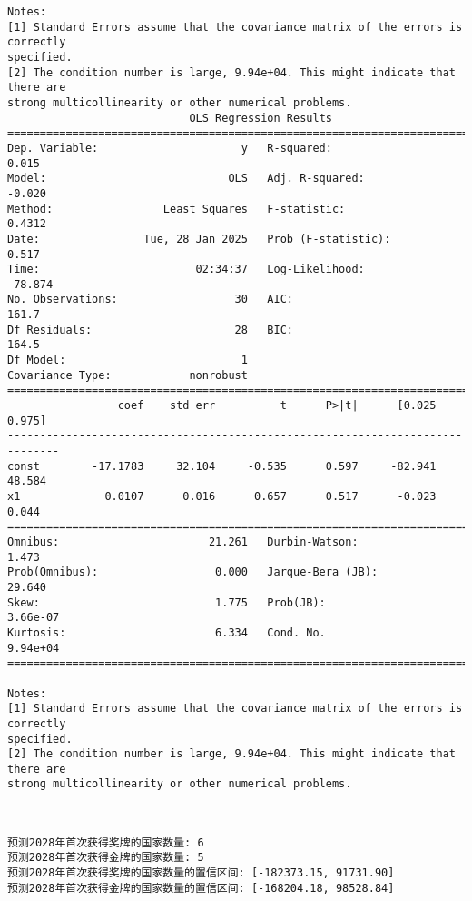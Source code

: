 \documentclass[11pt]{article}
\begin{document}
\begin{Verbatim}[commandchars=\\\{\}]
Notes:
[1] Standard Errors assume that the covariance matrix of the errors is correctly
specified.
[2] The condition number is large, 9.94e+04. This might indicate that there are
strong multicollinearity or other numerical problems.
                            OLS Regression Results
==============================================================================
Dep. Variable:                      y   R-squared:                       0.015
Model:                            OLS   Adj. R-squared:                 -0.020
Method:                 Least Squares   F-statistic:                    0.4312
Date:                Tue, 28 Jan 2025   Prob (F-statistic):              0.517
Time:                        02:34:37   Log-Likelihood:                -78.874
No. Observations:                  30   AIC:                             161.7
Df Residuals:                      28   BIC:                             164.5
Df Model:                           1
Covariance Type:            nonrobust
==============================================================================
                 coef    std err          t      P>|t|      [0.025      0.975]
------------------------------------------------------------------------------
const        -17.1783     32.104     -0.535      0.597     -82.941      48.584
x1             0.0107      0.016      0.657      0.517      -0.023       0.044
==============================================================================
Omnibus:                       21.261   Durbin-Watson:                   1.473
Prob(Omnibus):                  0.000   Jarque-Bera (JB):               29.640
Skew:                           1.775   Prob(JB):                     3.66e-07
Kurtosis:                       6.334   Cond. No.                     9.94e+04
==============================================================================

Notes:
[1] Standard Errors assume that the covariance matrix of the errors is correctly
specified.
[2] The condition number is large, 9.94e+04. This might indicate that there are
strong multicollinearity or other numerical problems.
    \end{Verbatim}

    \begin{center}
    \end{center}
    { \hspace*{\fill} \\}
    
    \begin{Verbatim}[commandchars=\\\{\}]
预测2028年首次获得奖牌的国家数量: 6
预测2028年首次获得金牌的国家数量: 5
预测2028年首次获得奖牌的国家数量的置信区间: [-182373.15, 91731.90]
预测2028年首次获得金牌的国家数量的置信区间: [-168204.18, 98528.84]
    \end{Verbatim}
\end{document}
